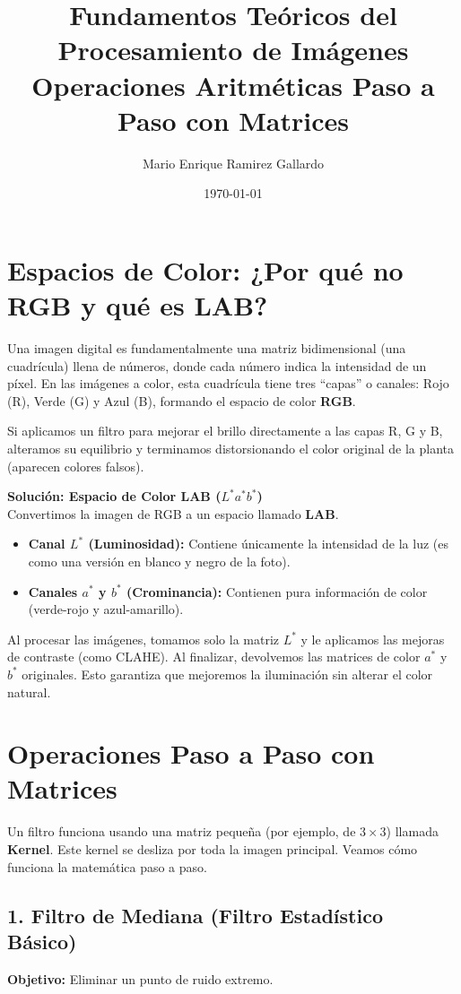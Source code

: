 \documentclass[11pt,a4paper]{article}
\title{\textbf{Fundamentos Teóricos del Procesamiento de Imágenes}\\ \large Operaciones Aritméticas Paso a Paso con Matrices}
\author{Mario Enrique Ramirez Gallardo}
\date{\today}
\begin{document}
\maketitle

\section{Espacios de Color: ¿Por qué no RGB y qué es LAB?}

Una imagen digital es fundamentalmente una matriz bidimensional (una cuadrícula) llena de números, donde cada número indica la intensidad de un píxel. En las imágenes a color, esta cuadrícula tiene tres ``capas'' o canales: Rojo (R), Verde (G) y Azul (B), formando el espacio de color \textbf{RGB}.

Si aplicamos un filtro para mejorar el brillo directamente a las capas R, G y B, alteramos su equilibrio y terminamos distorsionando el color original de la planta (aparecen colores falsos).

\textbf{Solución: Espacio de Color LAB ($L^*a^*b^*$)} \\
Convertimos la imagen de RGB a un espacio llamado \textbf{LAB}. 
\begin{itemize}
    \item \textbf{Canal $L^*$ (Luminosidad):} Contiene únicamente la intensidad de la luz (es como una versión en blanco y negro de la foto).
    \item \textbf{Canales $a^*$ y $b^*$ (Crominancia):} Contienen pura información de color (verde-rojo y azul-amarillo).
\end{itemize}
Al procesar las imágenes, tomamos solo la matriz $L^*$ y le aplicamos las mejoras de contraste (como CLAHE). Al finalizar, devolvemos las matrices de color $a^*$ y $b^*$ originales. Esto garantiza que mejoremos la iluminación sin alterar el color natural.

\section{Operaciones Paso a Paso con Matrices}

Un filtro funciona usando una matriz pequeña (por ejemplo, de $3 \times 3$) llamada \textbf{Kernel}. Este kernel se desliza por toda la imagen principal. Veamos cómo funciona la matemática paso a paso.

\subsection{1. Filtro de Mediana (Filtro Estadístico Básico)}
\textbf{Objetivo:} Eliminar un punto de ruido extremo.
\end{document}
